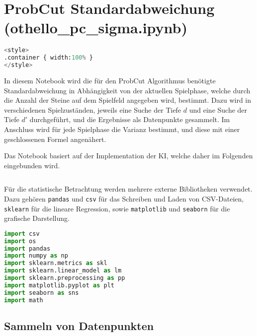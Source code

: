 \hypertarget{probcut-standardabweichung-othello_pc_sigma.ipynb}{%
\section{ProbCut Standardabweichung
(othello\_pc\_sigma.ipynb)}\label{probcut-standardabweichung-othello_pc_sigma.ipynb}}

\label{sec:pcsigma}

\begin{lstlisting}[language=Python]
%%HTML
<style>
.container { width:100% }
</style>
\end{lstlisting}

In diesem Notebook wird die für den ProbCut Algorithmus benötigte
Standardabweichung in Abhängigkeit von der aktuellen Spielphase, welche
durch die Anzahl der Steine auf dem Spielfeld angegeben wird, bestimmt.
Dazu wird in verschiedenen Spielzuständen, jeweils eine Suche der Tiefe
\(d\) und eine Suche der Tiefe \(d'\) durchgeführt, und die Ergebnisse
als Datenpunkte gesammelt. Im Anschluss wird für jede Spielphase die
Varianz bestimmt, und diese mit einer geschlossenen Formel angenähert.

Das Notebook basiert auf der Implementation der \ac{KI}, welche daher im
Folgenden eingebunden wird.

\begin{lstlisting}[language=Python]
%run othello_ai.ipynb
\end{lstlisting}

Für die statistische Betrachtung werden mehrere externe Bibliotheken
verwendet. Dazu gehören \passthrough{\lstinline!pandas!} und
\passthrough{\lstinline!csv!} für das Schreiben und Laden von
CSV-Dateien, \passthrough{\lstinline!sklearn!} für die lineare
Regression, sowie \passthrough{\lstinline!matplotlib!} und
\passthrough{\lstinline!seaborn!} für die grafische Darstellung.

\begin{lstlisting}[language=Python]
import csv
import os
import pandas
import numpy as np
import sklearn.metrics as skl
import sklearn.linear_model as lm
import sklearn.preprocessing as pp
import matplotlib.pyplot as plt
import seaborn as sns
import math
\end{lstlisting}

\hypertarget{sammeln-von-datenpunkten}{%
\subsection{Sammeln von Datenpunkten}\label{sammeln-von-datenpunkten}}

